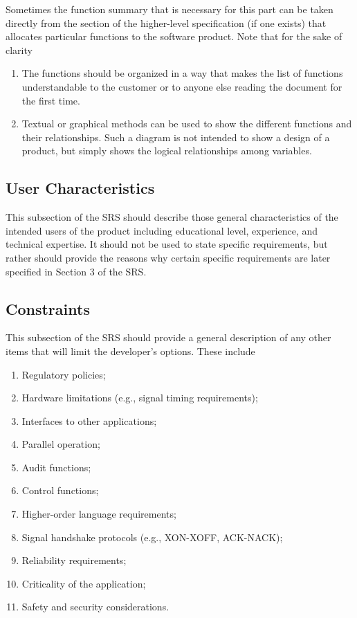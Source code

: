 \documentclass[draftclsnofoot,onecolumn,10pt]{IEEEtran}
\begin{document}
Sometimes the function summary that is necessary for this part can be taken
directly from the section of the higher-level specification (if one exists) that
allocates particular functions to the software product. Note that for the sake
of clarity
\begin{enumerate}
	\item The functions should be organized in a way that makes the list of
		functions understandable to the customer or to anyone else reading the
		document for the first time.
	\item Textual or graphical methods can be used to show the different
		functions and their relationships. Such a diagram is not intended to
		show a design of a product, but simply shows the logical relationships
		among variables.
\end{enumerate}

\subsection{User Characteristics}
This subsection of the SRS should describe those general characteristics of the
intended users of the product including educational level, experience, and
technical expertise. It should not be used to state specific requirements, but
rather should provide the reasons why certain specific requirements are later
specified in Section 3 of the SRS.

\subsection{Constraints}
This subsection of the SRS should provide a general description of any other
items that will limit the developer's options. These include
\begin{enumerate}
	\item Regulatory policies;
	\item Hardware limitations (e.g., signal timing requirements);
	\item Interfaces to other applications;
	\item Parallel operation;
	\item Audit functions;
	\item Control functions;
	\item Higher-order language requirements;
	\item Signal handshake protocols (e.g., XON-XOFF, ACK-NACK);
	\item Reliability requirements;
	\item Criticality of the application;
	\item Safety and security considerations.
\end{enumerate}
\end{document}
